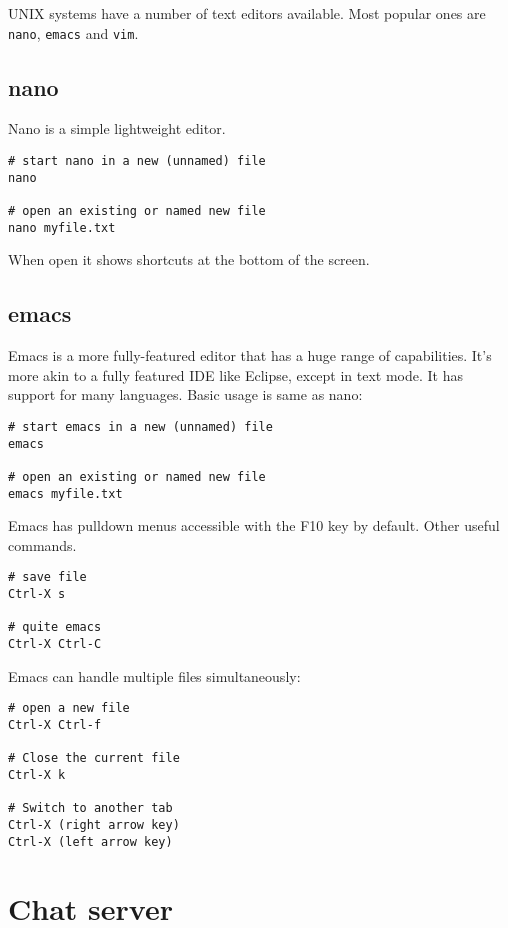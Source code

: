 UNIX systems have a number of text editors available.
Most popular ones are \texttt{nano}, \texttt{emacs} and \texttt{vim}.

\subsection{nano}

Nano is a simple lightweight editor.

\begin{verbatim}
# start nano in a new (unnamed) file
nano

# open an existing or named new file
nano myfile.txt
\end{verbatim}

When open it shows shortcuts at the bottom of the screen.

\subsection{emacs}

Emacs is a more fully-featured editor that has a huge range of capabilities.
It's more akin to a fully featured IDE like Eclipse, except in text mode.
It has support for many languages.
Basic usage is same as nano:

\begin{verbatim}
# start emacs in a new (unnamed) file
emacs

# open an existing or named new file
emacs myfile.txt
\end{verbatim}

Emacs has pulldown menus accessible with the F10 key by default.
Other useful commands.

\begin{verbatim}
# save file
Ctrl-X s

# quite emacs
Ctrl-X Ctrl-C
\end{verbatim}

Emacs can handle multiple files simultaneously:

\begin{verbatim}
# open a new file
Ctrl-X Ctrl-f

# Close the current file
Ctrl-X k

# Switch to another tab
Ctrl-X (right arrow key)
Ctrl-X (left arrow key)
\end{verbatim}

\section{Chat server}

